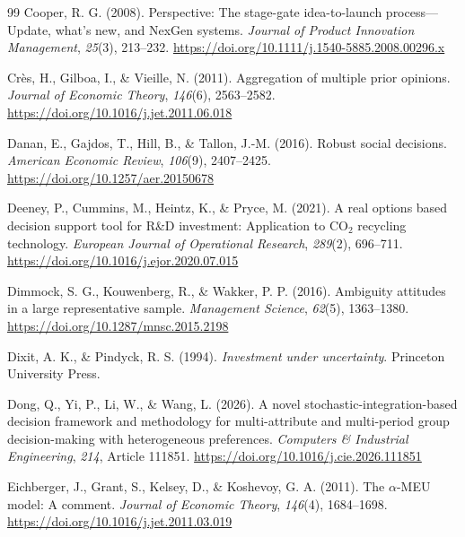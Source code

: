 \documentclass[5p,times,authoryear]{elsarticle}
\theoremstyle{plain}
\begin{document}
\begin{thebibliography}{99}
Cooper, R. G. (2008). Perspective: The stage-gate idea-to-launch process---Update, what's new, and NexGen systems. \emph{Journal of Product Innovation Management}, \emph{25}(3), 213--232. \url{https://doi.org/10.1111/j.1540-5885.2008.00296.x}

Cr\`es, H., Gilboa, I., \& Vieille, N. (2011). Aggregation of multiple prior opinions. \emph{Journal of Economic Theory}, \emph{146}(6), 2563--2582. \url{https://doi.org/10.1016/j.jet.2011.06.018}

Danan, E., Gajdos, T., Hill, B., \& Tallon, J.-M. (2016). Robust social decisions. \emph{American Economic Review}, \emph{106}(9), 2407--2425. \url{https://doi.org/10.1257/aer.20150678}

Deeney, P., Cummins, M., Heintz, K., \& Pryce, M. (2021). A real options based decision support tool for R\&D investment: Application to CO$_2$ recycling technology. \emph{European Journal of Operational Research}, \emph{289}(2), 696--711. \url{https://doi.org/10.1016/j.ejor.2020.07.015}

Dimmock, S. G., Kouwenberg, R., \& Wakker, P. P. (2016). Ambiguity attitudes in a large representative sample. \emph{Management Science}, \emph{62}(5), 1363--1380. \url{https://doi.org/10.1287/mnsc.2015.2198}

Dixit, A. K., \& Pindyck, R. S. (1994). \emph{Investment under uncertainty}. Princeton University Press.

Dong, Q., Yi, P., Li, W., \& Wang, L. (2026). A novel stochastic-integration-based decision framework and methodology for multi-attribute and multi-period group decision-making with heterogeneous preferences. \emph{Computers \& Industrial Engineering}, \emph{214}, Article 111851. \url{https://doi.org/10.1016/j.cie.2026.111851}

Eichberger, J., Grant, S., Kelsey, D., \& Koshevoy, G. A. (2011). The $\alpha$-MEU model: A comment. \emph{Journal of Economic Theory}, \emph{146}(4), 1684--1698. \url{https://doi.org/10.1016/j.jet.2011.03.019}


\end{thebibliography}
\end{document}
